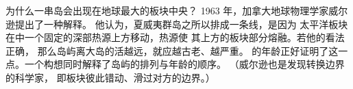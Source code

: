 \begin{history}[一位地球物理学家与一串岛屿]
为什么一串岛会出现在地球最大的板块中央？
1963 年，加拿大地球物理学家威尔逊提出了一种解释。
他认为，夏威夷群岛之所以排成一条线，是因为
太平洋板块在中一个固定的深部热源上方移动，热源使
其上方的板块部分熔融。若他的看法正确，
那么岛屿离大岛的活越远，就应越古老、越严重。
的年龄正好证明了这一点。一个构想同时解释了岛屿的排列与年龄的顺序。
（威尔逊也是发现转换边界的科学家，
即板块彼此错动、滑过对方的边界。）
\end{history}


